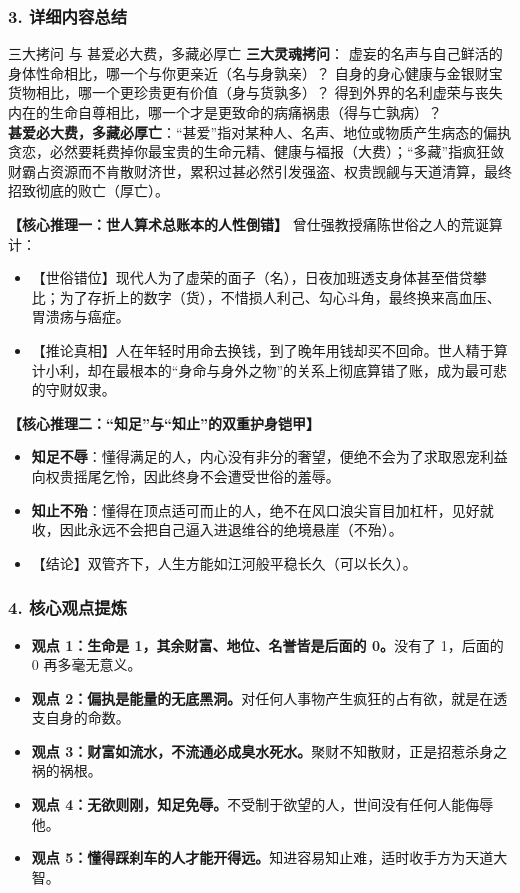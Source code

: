 \subsubsection{3. 详细内容总结}

\begin{ConceptBox}{三大拷问 与 甚爱必大费，多藏必厚亡}
\textbf{三大灵魂拷问}：
虚妄的名声与自己鲜活的身体性命相比，哪一个与你更亲近（名与身孰亲）？
自身的身心健康与金银财宝货物相比，哪一个更珍贵更有价值（身与货孰多）？
得到外界的名利虚荣与丧失内在的生命自尊相比，哪一个才是更致命的病痛祸患（得与亡孰病）？\\
\textbf{甚爱必大费，多藏必厚亡}：“甚爱”指对某种人、名声、地位或物质产生病态的偏执贪恋，必然要耗费掉你最宝贵的生命元精、健康与福报（大费）；“多藏”指疯狂敛财霸占资源而不肯散财济世，累积过甚必然引发强盗、权贵觊觎与天道清算，最终招致彻底的败亡（厚亡）。
\end{ConceptBox}

\noindent\textbf{【核心推理一：世人算术总账本的人性倒错】}
曾仕强教授痛陈世俗之人的荒诞算计：
\begin{itemize}
    \item 【世俗错位】现代人为了虚荣的面子（名），日夜加班透支身体甚至借贷攀比；为了存折上的数字（货），不惜损人利己、勾心斗角，最终换来高血压、胃溃疡与癌症。
    \item 【推论真相】人在年轻时用命去换钱，到了晚年用钱却买不回命。世人精于算计小利，却在最根本的“身命与身外之物”的关系上彻底算错了账，成为最可悲的守财奴隶。
\end{itemize}

\noindent\textbf{【核心推理二：“知足”与“知止”的双重护身铠甲】}
\begin{itemize}
    \item \textbf{知足不辱}：懂得满足的人，内心没有非分的奢望，便绝不会为了求取恩宠利益向权贵摇尾乞怜，因此终身不会遭受世俗的羞辱。
    \item \textbf{知止不殆}：懂得在顶点适可而止的人，绝不在风口浪尖盲目加杠杆，见好就收，因此永远不会把自己逼入进退维谷的绝境悬崖（不殆）。
    \item 【结论】双管齐下，人生方能如江河般平稳长久（可以长久）。
\end{itemize}

\subsubsection{4. 核心观点提炼}
\begin{itemize}
    \item \textbf{观点 1：生命是 1，其余财富、地位、名誉皆是后面的 0。}没有了 1，后面的 0 再多毫无意义。
    \item \textbf{观点 2：偏执是能量的无底黑洞。}对任何人事物产生疯狂的占有欲，就是在透支自身的命数。
    \item \textbf{观点 3：财富如流水，不流通必成臭水死水。}聚财不知散财，正是招惹杀身之祸的祸根。
    \item \textbf{观点 4：无欲则刚，知足免辱。}不受制于欲望的人，世间没有任何人能侮辱他。
    \item \textbf{观点 5：懂得踩刹车的人才能开得远。}知进容易知止难，适时收手方为天道大智。
\end{itemize}


